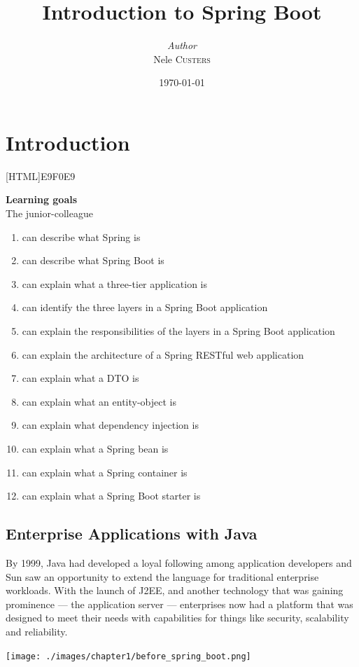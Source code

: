 \documentclass[a4paper, 12pt]{report}
\institute{Hogeschool PXL}
\title{Introduction to Spring Boot}
\author{\textit{Author}\\Nele \textsc{Custers}}
\date{\today}
\begin{document}
    \maketitle
    \romantableofcontents


\chapter{Introduction}
    
[HTML]{E9F0E9}{\parbox{\textwidth}{%
\noindent \textbf{Learning goals}\\
The junior-colleague
\begin{enumerate}[nolistsep]
\item can describe what Spring is
\item can describe what Spring Boot is
\item can explain what a three-tier application is
\item can identify the three layers in a Spring Boot application
\item can explain the responsibilities of the layers in a Spring Boot application
\item can explain the architecture of a Spring RESTful web application
\item can explain what a DTO is
\item can explain what an entity-object is
\item can explain what dependency injection is
\item can explain what a Spring bean is
\item can explain what a Spring container is
\item can explain what a Spring Boot starter is
\end{enumerate}}}


\section{Enterprise Applications with Java}
By 1999, Java had developed a loyal following among application developers and Sun saw an opportunity to extend the language for traditional enterprise workloads. With the launch of J2EE, and another technology that was gaining prominence — the application server — enterprises now had a platform that was designed to meet their needs with capabilities for things like security, scalability and reliability.

\texttt{[image: ./images/chapter1/before\_spring\_boot.png]} 
\end{document}
